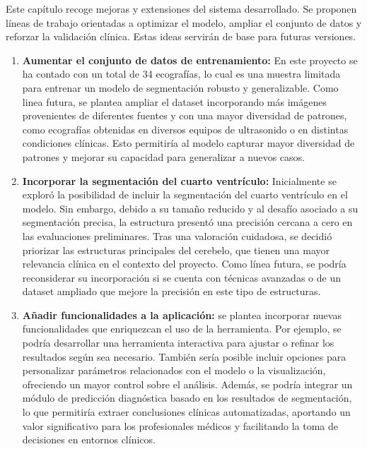 
Este capítulo recoge mejoras y extensiones del sistema desarrollado. Se proponen líneas de trabajo orientadas a optimizar el modelo, ampliar el conjunto de datos y reforzar la validación clínica. Estas ideas servirán de base para futuras versiones.

\begin{enumerate}
    \item \textbf{Aumentar el conjunto de datos de entrenamiento:} En este proyecto se ha contado con un total de 34 ecografías, lo cual es una muestra limitada para entrenar un modelo de segmentación robusto y generalizable. Como linea futura, se plantea ampliar el dataset incorporando más imágenes provenientes de diferentes fuentes y con una mayor diversidad de patrones, como ecografías obtenidas en diversos equipos de ultrasonido o en distintas condiciones clínicas. Esto permitiría al modelo capturar mayor diversidad de patrones y mejorar su capacidad para generalizar a nuevos casos.
    \item \textbf{Incorporar la segmentación del cuarto ventrículo:} Inicialmente se exploró la posibilidad de incluir la segmentación del cuarto ventrículo en el modelo. Sin embargo, debido a su tamaño reducido y al desafío asociado a su segmentación precisa, la estructura presentó una precisión cercana a cero en las evaluaciones preliminares. Tras una valoración cuidadosa, se decidió priorizar las estructuras principales del cerebelo, que tienen una mayor relevancia clínica en el contexto del proyecto. Como línea futura, se podría reconsiderar su incorporación si se cuenta con técnicas avanzadas o de un dataset ampliado que mejore la precisión en este tipo de estructuras.
    \item \textbf{Añadir funcionalidades a la aplicación:} se plantea incorporar nuevas funcionalidades que enriquezcan el uso de la herramienta. Por ejemplo, se podría desarrollar una herramienta interactiva para ajustar o refinar los resultados según sea necesario. También sería posible incluir opciones para personalizar parámetros relacionados con el modelo o la visualización, ofreciendo un mayor control sobre el análisis. Además, se podría integrar un módulo de predicción diagnóstica basado en los resultados de segmentación, lo que permitiría extraer conclusiones clínicas automatizadas, aportando un valor significativo para los profesionales médicos y facilitando la toma de decisiones en entornos clínicos.
\end{enumerate}